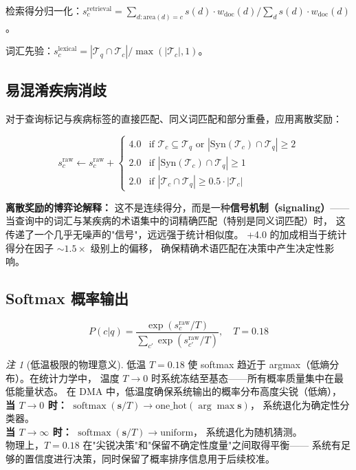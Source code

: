 \documentclass[11pt,a4paper]{ctexart}
\theoremstyle{remark}
\newtheorem{remark}{注}[section]
\DeclareMathOperator{\softmax}{softmax}
\begin{document}
检索得分归一化：$s_c^{\text{retrieval}} = \sum_{d: \text{area}(d)=c} s(d) \cdot w_{\text{doc}}(d) / \sum_d s(d) \cdot w_{\text{doc}}(d)$。

词汇先验：$s_c^{\text{lexical}} = |\mathcal{T}_q \cap \mathcal{T}_c| / \max(|\mathcal{T}_c|, 1)$。

\subsection{易混淆疾病消歧}

对于查询标记与疾病标签的直接匹配、同义词匹配和部分重叠，应用离散奖励：

\begin{equation}
s_c^{\text{raw}} \leftarrow s_c^{\text{raw}} +
\begin{cases}
4.0 & \text{if } \mathcal{T}_c \subseteq \mathcal{T}_q \text{ or } |\text{Syn}(\mathcal{T}_c) \cap \mathcal{T}_q| \geq 2 \\
2.0 & \text{if } |\text{Syn}(\mathcal{T}_c) \cap \mathcal{T}_q| \geq 1 \\
2.0 & \text{if } |\mathcal{T}_c \cap \mathcal{T}_q| \geq 0.5 \cdot |\mathcal{T}_c|
\end{cases}
\end{equation}

\textbf{离散奖励的博弈论解释：} 这不是连续得分，而是一种\textbf{信号机制（signaling）}——
当查询中的词汇与某疾病的术语集中的词精确匹配（特别是同义词匹配）时，
这传递了一个几乎无噪声的"信号"，远远强于统计相似度。
+4.0 的加成相当于统计得分在因子 $\sim 1.5\times$ 级别上的偏移，
确保精确术语匹配在决策中产生决定性影响。

\subsection{Softmax 概率输出}

\begin{equation}
P(c|q) = \frac{\exp(s_c^{\text{raw}} / T)}{\sum_{c'}\exp(s_{c'}^{\text{raw}} / T)}, \quad T = 0.18
\end{equation}

\begin{remark}[低温极限的物理意义]
低温 $T=0.18$ 使 softmax 趋近于 argmax（低熵分布）。在统计力学中，
温度 $T \to 0$ 时系统冻结至基态——所有概率质量集中在最低能量状态。
在 DMA 中，低温度确保系统输出的概率分布高度尖锐（低熵），
\\ \textbf{当 $T \to 0$ 时：} $\softmax(\mathbf{s}/T) \to \text{one\_hot}(\arg\max \mathbf{s})$，
系统退化为确定性分类器。
\\ \textbf{当 $T \to \infty$ 时：} $\softmax(\mathbf{s}/T) \to \text{uniform}$，
系统退化为随机猜测。
\\ 物理上，$T=0.18$ 在"尖锐决策"和"保留不确定性度量"之间取得平衡——
系统有足够的置信度进行决策，同时保留了概率排序信息用于后续校准。
\end{remark}
\end{document}
